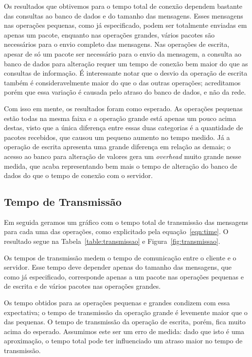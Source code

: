 \documentclass[12pt,a4paper]{article}
\begin{document}
Os resultados que obtivemos para o tempo total de conexão dependem bastante das consultas ao banco de dados e do tamanho das mensagens. Esses mensagens nas operações pequenas, como já especificado, podem ser totalmente enviadas em apenas um pacote, enquanto nas operações grandes, vários pacotes são necessários para o envio completo das mensagens. Nas operações de escrita, apesar de só um pacote ser necessário para o envio da mensagem, a consulta ao banco de dados para alteração requer um tempo de conexão bem maior do que as consultas de informação. É interessante notar que o desvio da operação de escrita também é consideravelmente maior do que o das outras operações; acreditamos porém que essa variação é causada pelo atraso do banco de dados, e não da rede.

Com isso em mente, os resultados foram como esperado. As operações pequenas estão todas na mesma faixa e a operação grande está apenas um pouco acima destas, visto que a única diferença entre essas duas categorias é a quantidade de pacotes recebidos, que causou um pequeno aumento no tempo medido. Já a operação de escrita apresenta uma grande diferença em relação as demais; o acesso ao banco para alteração de valores gera um {\it overhead} muito grande nesse medida, que acaba representando bem mais o tempo de alteração do banco de dados do que o tempo de conexão com o servidor.

\subsection{Tempo de Transmissão}

Em seguida geramos um gráfico com o tempo total de transmissão das mensagens para cada uma das operações, como explicitado pela equação~\ref{eqn:time}. O resultado segue na Tabela~\ref{table:transmissao} e Figura~\ref{fig:transmissao}.

Os tempos de transmissão medem o tempo de comunicação entre o cliente e o servidor. Esse tempo deve depender apenas do tamanho das mensagens, que como já especificado, corresponde apenas a um pacote nas operações pequenas e de escrita e de vários pacotes nas operações grandes. 

Os tempo obtidos para as operações pequenas e grandes condizem com essa expectativa; o tempo de transmissão da operação grande é levemente maior que o das pequenas. O tempo de transmissão da operação de escrita, porém, fica muito acima do esperado. Assumimos este ser um erro de medida: dado que isto é uma aproximação, o tempo total pode ter influenciado um atraso maior no tempo de transmissão.
\end{document}
